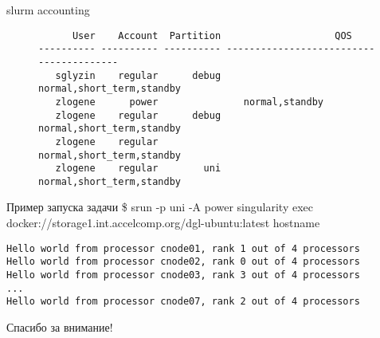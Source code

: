 \documentclass{beamer}
\begin{document}
\begin{frame}[fragile]{slurm accounting}
 \begin{figure}[H]
\centering
\begin{verbatim}
      User    Account  Partition                    QOS 
---------- ---------- ---------- ---------------------------------------- 
   sglyzin    regular      debug    normal,short_term,standby 
   zlogene      power               normal,standby 
   zlogene    regular      debug    normal,short_term,standby 
   zlogene    regular               normal,short_term,standby 
   zlogene    regular        uni    normal,short_term,standby 
\end{verbatim}
\end{figure}
\end{frame}

\begin{frame}[fragile]{Пример запуска задачи}
\$ srun -p uni -A power singularity exec docker://storage1.int.accelcomp.org/dgl-ubuntu:latest hostname

\begin{verbatim}
Hello world from processor cnode01, rank 1 out of 4 processors
Hello world from processor cnode02, rank 0 out of 4 processors
Hello world from processor cnode03, rank 3 out of 4 processors
...
Hello world from processor cnode07, rank 2 out of 4 processors
\end{verbatim}
\end{frame}

\begin{frame}[plain]
\centering
Спасибо за внимание!
\end{frame}

%
%
%
%
\end{document}
